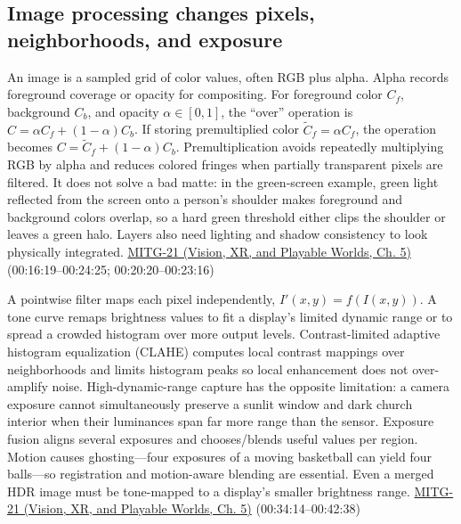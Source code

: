 \subsection{Image processing changes pixels, neighborhoods, and exposure}\label{03-visual-computing-i-ch004-image-processing-changes-pixels-neighborhoods-and-exposure}

\hypertarget{03-visual-computing-i-ch004-image-processing-changes-pixels-neighborhoods-and-exposure}{}

An image is a sampled grid of color values, often RGB plus alpha. Alpha records foreground coverage or opacity for compositing. For foreground color \(C_f\), background \(C_b\), and opacity \(\alpha\in[0,1]\), the ``over'' operation is \(C=\alpha C_f+(1-\alpha)C_b\). If storing premultiplied color \(\tilde C_f=\alpha C_f\), the operation becomes \(C=\tilde C_f+(1-\alpha)C_b\). Premultiplication avoids repeatedly multiplying RGB by alpha and reduces colored fringes when partially transparent pixels are filtered. It does not solve a bad matte: in the green-screen example, green light reflected from the screen onto a person's shoulder makes foreground and background colors overlap, so a hard green threshold either clips the shoulder or leaves a green halo. Layers also need lighting and shadow consistency to look physically integrated. \href{../07-Vision-XR-and-Playable-Worlds/main.pdf\#nameddest=04-visual-computing-ii-ch036-mitg-21---image-processing}{MITG-21 (Vision, XR, and Playable Worlds, Ch. 5)} (00:16:19--00:24:25; 00:20:20--00:23:16)

A pointwise filter maps each pixel independently, \(I'(x,y)=f(I(x,y))\). A tone curve remaps brightness values to fit a display's limited dynamic range or to spread a crowded histogram over more output levels. Contrast-limited adaptive histogram equalization (CLAHE) computes local contrast mappings over neighborhoods and limits histogram peaks so local enhancement does not over-amplify noise. High-dynamic-range capture has the opposite limitation: a camera exposure cannot simultaneously preserve a sunlit window and dark church interior when their luminances span far more range than the sensor. Exposure fusion aligns several exposures and chooses/blends useful values per region. Motion causes ghosting---four exposures of a moving basketball can yield four balls---so registration and motion-aware blending are essential. Even a merged HDR image must be tone-mapped to a display's smaller brightness range. \href{../07-Vision-XR-and-Playable-Worlds/main.pdf\#nameddest=04-visual-computing-ii-ch036-mitg-21---image-processing}{MITG-21 (Vision, XR, and Playable Worlds, Ch. 5)} (00:34:14--00:42:38)

